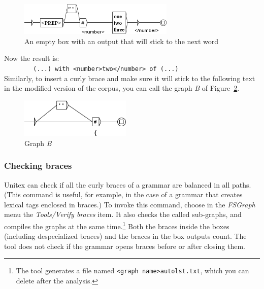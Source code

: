 \begin{figure}[!ht]
\begin{center}
\includegraphics[width=280px]{resources/img/empty-with-output-right-word.png}
\caption{An empty box with an output that will stick to the next word
\label{empty-with-output-right-word}}
\end{center}
\end{figure}

\noindent Now the result is:\\

\verb$        (...) with <number>two</number> of (...)$\\

\noindent Similarly, to insert a curly brace and make sure it will stick to the following text in the
modified version of the corpus, you can call the graph \textit{B} of
Figure~\ref{fig-graphe-B}.

\begin{figure}[!ht]
\begin{center}
\includegraphics[width=200px]{resources/img/B.png}
\caption{Graph \textit{B} \label{fig-graphe-B}}
\end{center}
\end{figure}

\subsubsection{Checking braces}
Unitex can check if all the curly braces of a grammar are balanced in all paths.
(This command is useful, for example, in the case of a grammar that creates
lexical tags enclosed in braces.) To invoke this command, choose in the
\textit{FSGraph} menu the \textit{Tools/Verify braces} item. It also checks the called
sub-graphs, and compiles the graphs at the same time.\footnote{ The tool generates
a file named \texttt{<graph name>autolst.txt}, which you can delete after the
analysis.} Both the braces inside the boxes (including despecialized braces) and the
braces in the box outputs count. The tool does not check if the grammar opens braces
before or after closing them.


